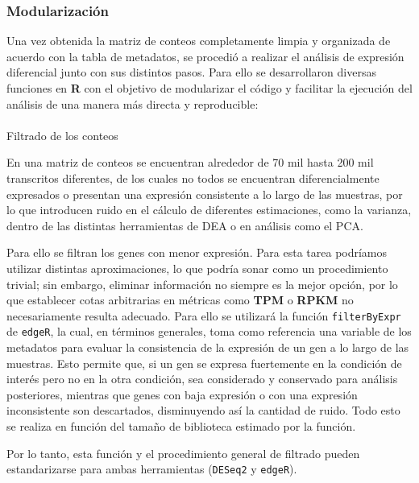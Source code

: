 \documentclass[
  9pt,
]{article}
\makeatletter
\let\oldparagraph\paragraph
\renewcommand{\paragraph}{
    \@ifstar
      \xxxParagraphStar
      \xxxParagraphNoStar
  }
\newcommand{\xxxParagraphStar}[1]{\oldparagraph*{#1}\mbox{}}
\newcommand{\xxxParagraphNoStar}[1]{\oldparagraph{#1}\mbox{}}
\makeatother
\begin{document}
\subsubsection{Modularización}\label{modularizaciuxf3n}

Una vez obtenida la matriz de conteos completamente limpia y organizada
de acuerdo con la tabla de metadatos, se procedió a realizar el análisis
de expresión diferencial junto con sus distintos pasos. Para ello se
desarrollaron diversas funciones en \textbf{R} con el objetivo de
modularizar el código y facilitar la ejecución del análisis de una
manera más directa y reproducible:

\paragraph{Filtrado de los conteos}\label{filtrado-de-los-conteos}

En una matriz de conteos se encuentran alrededor de 70 mil hasta 200 mil
transcritos diferentes, de los cuales no todos se encuentran
diferencialmente expresados o presentan una expresión consistente a lo
largo de las muestras, por lo que introducen ruido en el cálculo de
diferentes estimaciones, como la varianza, dentro de las distintas
herramientas de DEA o en análisis como el PCA.

Para ello se filtran los genes con menor expresión. Para esta tarea
podríamos utilizar distintas aproximaciones, lo que podría sonar como un
procedimiento trivial; sin embargo, eliminar información no siempre es
la mejor opción, por lo que establecer cotas arbitrarias en métricas
como \textbf{TPM} o \textbf{RPKM} no necesariamente resulta adecuado.
Para ello se utilizará la función \texttt{filterByExpr} de
\texttt{edgeR}, la cual, en términos generales, toma como referencia una
variable de los metadatos para evaluar la consistencia de la expresión
de un gen a lo largo de las muestras. Esto permite que, si un gen se
expresa fuertemente en la condición de interés pero no en la otra
condición, sea considerado y conservado para análisis posteriores,
mientras que genes con baja expresión o con una expresión inconsistente
son descartados, disminuyendo así la cantidad de ruido. Todo esto se
realiza en función del tamaño de biblioteca estimado por la función.

Por lo tanto, esta función y el procedimiento general de filtrado pueden
estandarizarse para ambas herramientas (\texttt{DESeq2} y
\texttt{edgeR}).
\end{document}
